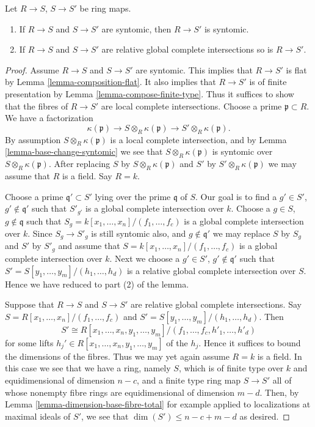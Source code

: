 \begin{lemma}
\label{lemma-composition-syntomic}
Let $R \to S$, $S \to S'$ be ring maps.
\begin{enumerate}
\item If $R \to S$ and $S \to S'$ are syntomic, then $R \to S'$
is syntomic.
\item If $R \to S$ and $S \to S'$ are relative global complete intersections
so is $R \to S'$.
\end{enumerate}
\end{lemma}

\begin{proof}
Assume $R \to S$ and $S \to S'$ are syntomic.
This implies that $R \to S'$ is flat by
Lemma \ref{lemma-composition-flat}.
It also implies that $R \to S'$ is of finite presentation by
Lemma \ref{lemma-compose-finite-type}.
Thus it suffices to show that the fibres of $R \to S'$ are
local complete intersections.
Choose a prime $\mathfrak p \subset R$.
We have a factorization
$$
\kappa(\mathfrak p) \to
S \otimes_R \kappa(\mathfrak p) \to
S' \otimes_R \kappa(\mathfrak p).
$$
By assumption $S \otimes_R \kappa(\mathfrak p)$ is
a local complete intersection, and by Lemma \ref{lemma-base-change-syntomic}
we see that $S\otimes_R \kappa(\mathfrak p)$ is syntomic over
$S \otimes_R \kappa(\mathfrak p)$.
After replacing $S$ by $S \otimes_R \kappa(\mathfrak p)$
and $S'$ by $S' \otimes_R \kappa(\mathfrak p)$ we may assume
that $R$ is a field. Say $R = k$.

\medskip\noindent
Choose a prime $\mathfrak q' \subset S'$ lying over the prime
$\mathfrak q$ of $S$. Our goal is to find a $g' \in S'$,
$g' \not \in \mathfrak q'$ such that $S'_{g'}$ is a global complete
intersection over $k$. Choose a $g \in S$, $g \not \in \mathfrak q$
such that $S_g = k[x_1, \ldots, x_n]/(f_1, \ldots, f_c)$ is
a global complete intersection over $k$.
Since $S_g \to S'_g$ is still syntomic also, and $g \not \in \mathfrak q'$
we may replace $S$ by $S_g$ and $S'$ by $S'_g$ and assume that
$S =  k[x_1, \ldots, x_n]/(f_1, \ldots, f_c)$ is
a global complete intersection over $k$. Next we choose a $g' \in S'$,
$g' \not \in \mathfrak q'$ such that
$S' = S[y_1, \ldots, y_m]/(h_1, \ldots, h_d)$
is a relative global complete intersection over $S$.
Hence we have reduced to part (2) of the lemma.

\medskip\noindent
Suppose that $R \to S$ and $S \to S'$ are
relative global complete intersections. Say
$S =  R[x_1, \ldots, x_n]/(f_1, \ldots, f_c)$
and
$S' = S[y_1, \ldots, y_m]/(h_1, \ldots, h_d)$.
Then
$$
S' \cong
R[x_1, \ldots, x_n, y_1, \ldots, y_m]/(f_1, \ldots, f_c, h'_1, \ldots, h'_d)
$$
for some lifts $h_j' \in R[x_1, \ldots, x_n, y_1, \ldots, y_m]$ of the $h_j$.
Hence it suffices to bound the dimensions of the fibres.
Thus we may yet again assume $R = k$ is a field.
In this case we see that we have a ring, namely $S$, which is of finite
type over $k$ and equidimensional of dimension $n - c$, and a
finite type ring map $S \to S'$ all of whose nonempty fibre
rings are equidimensional of dimension $m - d$. Then, by
Lemma \ref{lemma-dimension-base-fibre-total} for example applied
to localizations at maximal ideals of $S'$, we see that
$\dim(S') \leq n - c + m - d$ as desired.
\end{proof}


